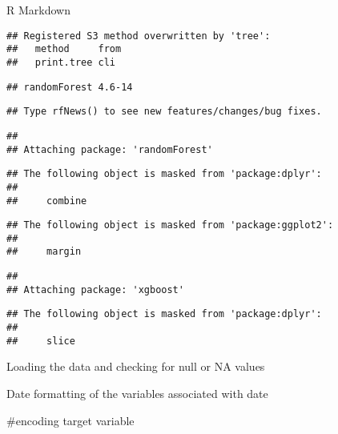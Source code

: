 \documentclass[
  ignorenonframetext,
]{beamer}
\begin{document}
\begin{frame}[fragile]{R Markdown}
\begin{verbatim}
## Registered S3 method overwritten by 'tree':
##   method     from
##   print.tree cli
\end{verbatim}

\begin{verbatim}
## randomForest 4.6-14
\end{verbatim}

\begin{verbatim}
## Type rfNews() to see new features/changes/bug fixes.
\end{verbatim}

\begin{verbatim}
## 
## Attaching package: 'randomForest'
\end{verbatim}

\begin{verbatim}
## The following object is masked from 'package:dplyr':
## 
##     combine
\end{verbatim}

\begin{verbatim}
## The following object is masked from 'package:ggplot2':
## 
##     margin
\end{verbatim}

\begin{verbatim}
## 
## Attaching package: 'xgboost'
\end{verbatim}

\begin{verbatim}
## The following object is masked from 'package:dplyr':
## 
##     slice
\end{verbatim}

Loading the data and checking for null or NA values

Date formatting of the variables associated with date

\#encoding target variable


\end{frame}
\end{document}
